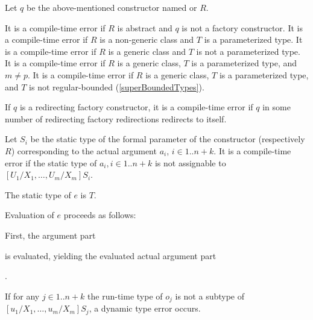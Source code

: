 \documentclass[makeidx]{article}
\begin{document}
{\LMHash{}%
Let $q$ be the above-mentioned constructor named  or $R$.

\LMHash{}%
It is a compile-time error if $R$ is abstract
and $q$ is not a factory constructor.
It is a compile-time error if $R$ is a non-generic class
and $T$ is a parameterized type.
It is a compile-time error if $R$ is a generic class
and $T$ is not a parameterized type.
It is a compile-time error if $R$ is a generic class,
$T$ is a parameterized type, and $m \not= p$.
It is a compile-time error if $R$ is a generic class,
$T$ is a parameterized type,
and $T$ is not regular-bounded
(\ref{superBoundedTypes}).

\LMHash{}%
If $q$ is a redirecting factory constructor,
it is a compile-time error if $q$ in some number of
redirecting factory redirections redirects to itself.

\LMHash{}%
Let $S_i$ be the static type of
the formal parameter of the constructor  (respectively $R$)
corresponding to the actual argument $a_i$, $i \in 1 .. n+k$.
It is a compile-time error if the static type of
$a_i, i \in 1 .. n + k$
is not assignable to $[U_1/X_1, \ldots, U_m/X_m]S_i$.

\LMHash{}%
The static type of $e$ is $T$.

\LMHash{}%
Evaluation of $e$ proceeds as follows:

\LMHash{}%
First, the argument part

\noindent
{}

\noindent
is evaluated, yielding the evaluated actual argument part

\noindent
{}.

\noindent
{}
If for any
$j \in 1 .. n + k$
the run-time type of $o_j$ is not a subtype of
$[u_1/X_1, \ldots, u_m/X_m]S_j$,
a dynamic type error occurs.

}
\end{document}
